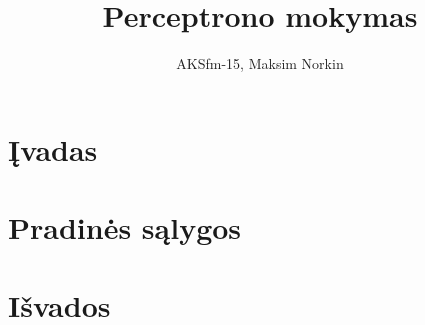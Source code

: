 \documentclass[11pt, a4paper, lithuanian]{article}
\author{AKSfm-15, Maksim Norkin}
\title{Perceptrono mokymas}
\begin{document}
    \maketitle

    \section{Įvadas}

    \section{Pradinės sąlygos}

    \section{Išvados}
\end{document}

